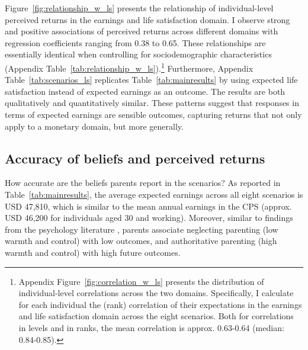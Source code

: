 \documentclass[12pt, a4paper, english]{article}
\begin{document}
Figure~\ref{fig:relationship_w_ls} presents the relationship of individual-level perceived returns in the earnings and life satisfaction domain. I observe strong and positive associations of perceived returns across different domains with regression coefficients ranging from 0.38 to 0.65. These relationships are essentially identical when controlling for sociodemographic characteristics (Appendix Table~\ref{tab:relationship_w_ls}).\footnote{Appendix Figure~\ref{fig:correlation_w_ls} presents the distribution of individual-level correlations across the two domains. Specifically, I calculate for each individual the (rank) correlation of their expectations in the earnings and life satisfaction domain across the eight scenarios. Both for correlations in levels and in ranks, the mean correlation is approx. 0.63-0.64 (median: 0.84-0.85).} Furthermore, Appendix Table~\ref{tab:scenarios_ls} replicates Table~\ref{tab:mainresults} by using expected life satisfaction instead of expected earnings as an outcome. The results are both qualitatively and quantitatively similar. These patterns suggest that responses in terms of expected earnings are sensible outcomes, capturing returns that not only apply to a monetary domain, but more generally. 

\subsection{Accuracy of beliefs and perceived returns}\label{sec:accuracy}
How accurate are the beliefs parents report in the scenarios? As reported in Table~\ref{tab:mainresults}, the average expected earnings across all eight scenarios is USD 47,810, which is similar to the mean annual earnings in the CPS (approx. USD 46,200 for individuals aged 30 and working). Moreover, similar to findings from the psychology literature \citep[e.g.,][]{ChanKoo2011,Dornbuschetal1987,Lambornetal1991}, parents associate neglecting parenting (low warmth and control) with low outcomes, and authoritative parenting (high warmth and control) with high future outcomes.
\end{document}
